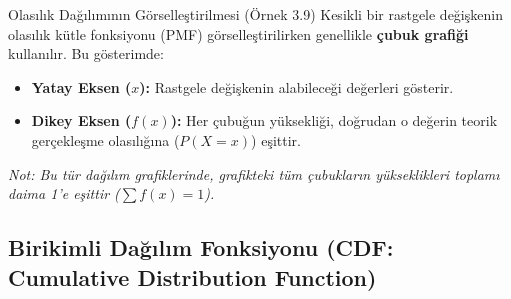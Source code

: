 \documentclass[light]{lutbeamer}
\begin{document}
\begin{frame}{Olasılık Dağılımının Görselleştirilmesi (Örnek 3.9)}
    Kesikli bir rastgele değişkenin olasılık kütle fonksiyonu (PMF) görselleştirilirken genellikle \textbf{çubuk grafiği} kullanılır. Bu gösterimde:
    
    \begin{itemize}
        \item \textbf{Yatay Eksen ($x$):} Rastgele değişkenin alabileceği değerleri gösterir.
        \item \textbf{Dikey Eksen ($f(x)$):} Her çubuğun yüksekliği, doğrudan o değerin teorik gerçekleşme olasılığına ($P(X=x)$) eşittir.
    \end{itemize}

    \begin{center}
    \end{center}
    
    \vspace{-0.4cm}
    \begin{center}
        \scriptsize \textit{Not: Bu tür dağılım grafiklerinde, grafikteki tüm çubukların yükseklikleri toplamı daima 1'e eşittir ($\sum f(x) = 1$).}
    \end{center}
\end{frame}



\subsection{Birikimli Dağılım Fonksiyonu (CDF: Cumulative Distribution Function)}
\end{document}
